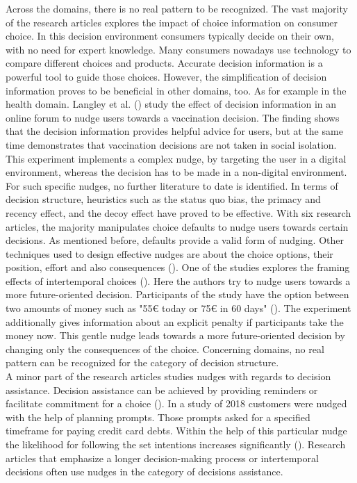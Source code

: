 Across the domains, there is no real pattern to be recognized. The vast majority of the research articles explores the impact of choice information on consumer choice. In this decision environment consumers typically decide on their own, with no need for expert knowledge. Many consumers nowadays use technology to compare different choices and products. Accurate decision information is a powerful tool to guide those choices. 
However, the simplification of decision information proves to be beneficial in other domains, too. As for example in the health domain. Langley et al. (\citeyear{langley_should_2015}) study the effect of decision information in an online forum to nudge users towards a vaccination decision. The finding shows that the decision information provides helpful advice for users, but at the same time demonstrates that vaccination decisions are not taken in social isolation. This experiment implements a complex nudge, by targeting the user in a digital environment, whereas the decision has to be made in a non-digital environment. For such specific nudges, no further literature to date is identified.
In terms of decision structure, heuristics such as the status quo bias, the primacy and recency effect, and the decoy effect have proved to be effective. With six research articles, the majority manipulates choice defaults to nudge users towards certain decisions. As mentioned before, defaults provide a valid form of nudging. Other techniques used to design effective nudges are about the choice options, their position, effort and also consequences (\cite{munscher_review_2016}). One of the studies explores the framing effects of intertemporal choices (\cite{faralla_framing_2017}). Here the authors try to nudge users towards a more future-oriented decision. Participants of the study have the option between two amounts of money such as "55€ today or 75€ in 60 days" (\cite[p.13]{faralla_framing_2017}). The experiment additionally gives information about an explicit penalty if participants take the money now. This gentle nudge leads towards a more future-oriented decision by changing only the consequences of the choice. Concerning domains, no real pattern can be recognized for the category of decision structure.
\\

A minor part of the research articles studies nudges with regards to decision assistance. Decision assistance can be achieved by providing reminders or facilitate commitment for a choice (\cite{munscher_review_2016}). In a study of 2018 customers were nudged with the help of planning prompts. Those prompts asked for a specified timeframe for paying credit card debts. Within the help of this particular nudge the likelihood for following the set intentions increases significantly (\cite{mazar_if_2018}).
Research articles that emphasize a longer decision-making process or intertemporal decisions often use nudges in the category of decisions assistance.
\\

